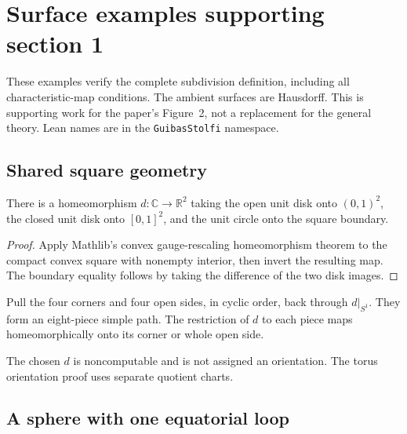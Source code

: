 \section{Surface examples supporting section 1}

These examples verify the complete subdivision definition, including all
characteristic-map conditions. The ambient surfaces are Hausdorff. This is
supporting work for the paper's Figure~2, not a replacement for the general
theory. Lean names are in the \texttt{GuibasStolfi} namespace.

\subsection{Shared square geometry}

\begin{lemma}\label{lem:disk-square}

  There is a homeomorphism $d:\mathbb C\to\mathbb R^2$ taking the open unit
  disk onto $(0,1)^2$, the closed unit disk onto $[0,1]^2$, and the unit circle
  onto the square boundary.
\end{lemma}
\begin{proof}

  Apply Mathlib's convex gauge-rescaling homeomorphism theorem to the compact
  convex square with nonempty interior, then invert the resulting map.
  The boundary equality follows by taking the difference of the two disk images.
\end{proof}

\begin{definition}\label{def:square-path}

  Pull the four corners and four open sides, in cyclic order, back through
  $d|_{S^1}$. They form an eight-piece simple path. The restriction of $d$ to
  each piece maps homeomorphically onto its corner or whole open side.
\end{definition}
The chosen $d$ is noncomputable and is not assigned an orientation. The torus
orientation proof uses separate quotient charts.

\subsection{A sphere with one equatorial loop}

